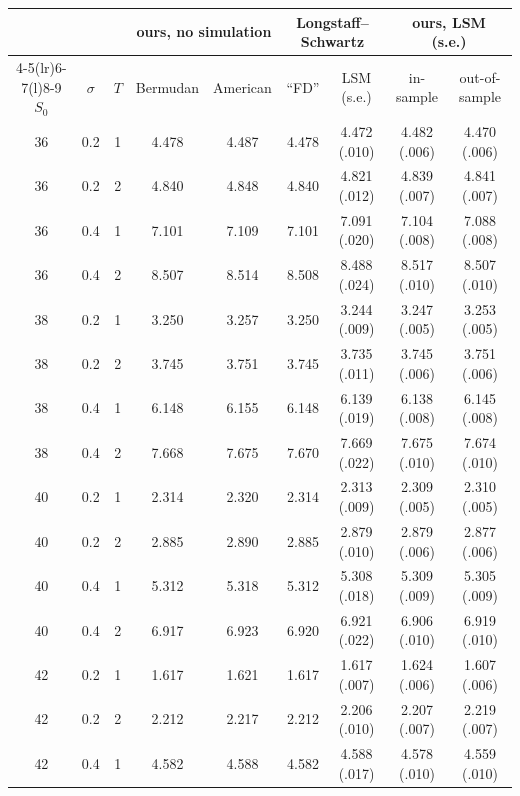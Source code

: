 \begin{table}[ht]
  \centering
  \footnotesize
  \setlength{\tabcolsep}{4.2pt}
  \begin{tabular}{@{}ccc@{\hspace{8pt}}cc@{\hspace{8pt}}cc@{\hspace{8pt}}cc@{}}
    \toprule
    & & & \multicolumn{2}{c}{ours, no simulation} & \multicolumn{2}{c}{Longstaff--Schwartz} & \multicolumn{2}{c}{ours, LSM (s.e.)}\\
    \cmidrule(lr){4-5}\cmidrule(lr){6-7}\cmidrule(l){8-9}
    $S_0$ & $\sigma$ & $T$ & Bermudan & American & ``FD'' & LSM (s.e.) & in-sample & out-of-sample\\
    \midrule
36 & 0.2 & 1 & 4.478 & 4.487 & 4.478 & 4.472 (.010) & 4.482 (.006) & 4.470 (.006)\\
36 & 0.2 & 2 & 4.840 & 4.848 & 4.840 & 4.821 (.012) & 4.839 (.007) & 4.841 (.007)\\
36 & 0.4 & 1 & 7.101 & 7.109 & 7.101 & 7.091 (.020) & 7.104 (.008) & 7.088 (.008)\\
36 & 0.4 & 2 & 8.507 & 8.514 & 8.508 & 8.488 (.024) & 8.517 (.010) & 8.507 (.010)\\
38 & 0.2 & 1 & 3.250 & 3.257 & 3.250 & 3.244 (.009) & 3.247 (.005) & 3.253 (.005)\\
38 & 0.2 & 2 & 3.745 & 3.751 & 3.745 & 3.735 (.011) & 3.745 (.006) & 3.751 (.006)\\
38 & 0.4 & 1 & 6.148 & 6.155 & 6.148 & 6.139 (.019) & 6.138 (.008) & 6.145 (.008)\\
38 & 0.4 & 2 & 7.668 & 7.675 & 7.670 & 7.669 (.022) & 7.675 (.010) & 7.674 (.010)\\
40 & 0.2 & 1 & 2.314 & 2.320 & 2.314 & 2.313 (.009) & 2.309 (.005) & 2.310 (.005)\\
40 & 0.2 & 2 & 2.885 & 2.890 & 2.885 & 2.879 (.010) & 2.879 (.006) & 2.877 (.006)\\
40 & 0.4 & 1 & 5.312 & 5.318 & 5.312 & 5.308 (.018) & 5.309 (.009) & 5.305 (.009)\\
40 & 0.4 & 2 & 6.917 & 6.923 & 6.920 & 6.921 (.022) & 6.906 (.010) & 6.919 (.010)\\
42 & 0.2 & 1 & 1.617 & 1.621 & 1.617 & 1.617 (.007) & 1.624 (.006) & 1.607 (.006)\\
42 & 0.2 & 2 & 2.212 & 2.217 & 2.212 & 2.206 (.010) & 2.207 (.007) & 2.219 (.007)\\
42 & 0.4 & 1 & 4.582 & 4.588 & 4.582 & 4.588 (.017) & 4.578 (.010) & 4.559 (.010)\\

\end{tabular}
\end{table}
